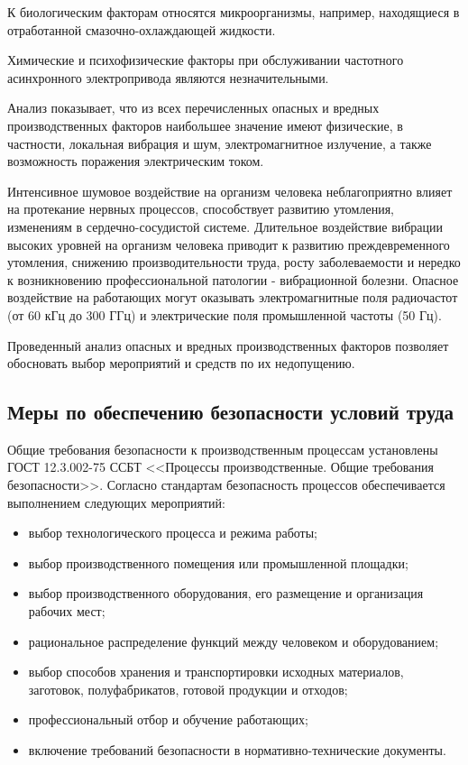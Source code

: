         К биологическим факторам относятся микроорганизмы, например,
        находящиеся в отработанной смазочно-охлаждающей жидкости. 

        Химические и психофизические факторы при обслуживании частотного
        асинхронного электропривода являются незначительными.

        Анализ показывает, что из всех перечисленных опасных и вредных
        производственных факторов наибольшее значение имеют физические, в
        частности, локальная вибрация и шум, электромагнитное излучение, а
        также возможность поражения электрическим током.

        Интенсивное шумовое воздействие на организм человека неблагоприятно
        влияет на протекание нервных процессов, способствует развитию
        утомления, изменениям в сердечно-сосудистой системе. Длительное
        воздействие вибрации высоких уровней на организм человека приводит к
        развитию преждевременного утомления, снижению производительности труда,
        росту заболеваемости и нередко к возникновению профессиональной
        патологии - вибрационной болезни.  Опасное воздействие на работающих
        могут оказывать электромагнитные поля радиочастот (от 60 кГц до 300 ГГц) и
        электрические поля промышленной частоты (50 Гц). 

        
        Проведенный анализ опасных и вредных производственных факторов
        позволяет обосновать выбор мероприятий и средств по их недопущению.

    \subsection{Меры по обеспечению безопасности условий труда}

        Общие требования безопасности к производственным процессам установлены
        ГОСТ 12.3.002-75 ССБТ <<Процессы производственные. Общие требования
        безопасности>>. Согласно стандартам безопасность процессов обеспечивается
        выполнением следующих мероприятий:

        \begin{itemize}
            \item выбор технологического процесса и режима работы;
            \item выбор производственного помещения или промышленной площадки;
            \item выбор производственного оборудования, его размещение и
                организация рабочих мест;
            \item рациональное распределение функций между человеком и
                оборудованием;
            \item выбор способов хранения и транспортировки исходных
                материалов, заготовок, полуфабрикатов, готовой продукции и
                отходов; 
            \item профессиональный отбор и обучение работающих; 
            \item включение требований безопасности в нормативно-технические
                документы.
        \end{itemize}

